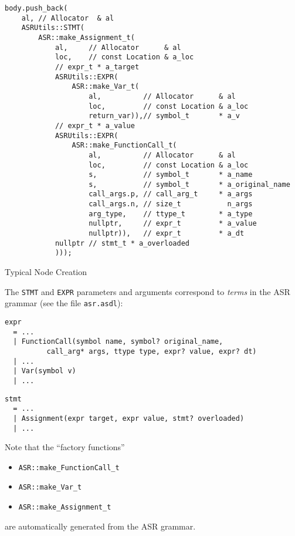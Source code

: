 \documentclass[10pt,oneside,x11names]{article}
\begin{document}
\begin{listing}[htbp]
\begin{verbatim}
body.push_back(
    al, // Allocator  & al
    ASRUtils::STMT(
        ASR::make_Assignment_t(
            al,     // Allocator      & al
            loc,    // const Location & a_loc
            // expr_t * a_target
            ASRUtils::EXPR(
                ASR::make_Var_t(
                    al,          // Allocator      & al
                    loc,         // const Location & a_loc
                    return_var)),// symbol_t       * a_v
            // expr_t * a_value
            ASRUtils::EXPR(
                ASR::make_FunctionCall_t(
                    al,          // Allocator      & al
                    loc,         // const Location & a_loc
                    s,           // symbol_t       * a_name
                    s,           // symbol_t       * a_original_name
                    call_args.p, // call_arg_t     * a_args
                    call_args.n, // size_t           n_args
                    arg_type,    // ttype_t        * a_type
                    nullptr,     // expr_t         * a_value
                    nullptr)),   // expr_t         * a_dt
            nullptr // stmt_t * a_overloaded
            )));

\end{verbatim}
\caption{\label{fig:typical-node-creation}Typical Node Creation}
\end{listing}

\newpage
The \texttt{STMT} and \texttt{EXPR} parameters and arguments correspond to
\emph{terms} in the ASR grammar (see the file \texttt{asr.asdl}):

\vskip 0.26cm
\begin{verbatim}
expr
  = ...
  | FunctionCall(symbol name, symbol? original_name,
          call_arg* args, ttype type, expr? value, expr? dt)
  | ...
  | Var(symbol v)
  | ...
\end{verbatim}

\vskip 0.26cm
\begin{verbatim}
stmt
  = ...
  | Assignment(expr target, expr value, stmt? overloaded)
  | ...
\end{verbatim}

Note that the ``factory functions''
\begin{itemize}
\item \texttt{ASR::make_FunctionCall_t}
\item \texttt{ASR::make_Var_t}
\item \texttt{ASR::make_Assignment_t}
\end{itemize}
are automatically
generated from the ASR grammar.
\end{document}
